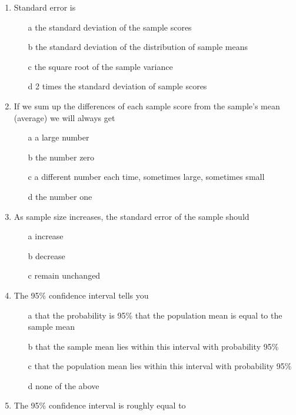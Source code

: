 \documentclass[12pt]{book}
\begin{document}
\begin{enumerate}
\item Standard error is

\begin{enumerate}
\item[a] the standard deviation of the sample scores
\item[b] the standard deviation of the distribution of sample means
\item[c] the square root of the sample variance
\item[d] 2 times the standard deviation of sample scores
\end{enumerate}

\item
If we sum up the differences of each sample score from the sample's mean (average) we will always get

\begin{enumerate}
\item[a] a large number
\item[b] the number zero
\item[c] a different number each time, sometimes large, sometimes small
\item[d] the number one
\end{enumerate}

\item As sample size increases, the standard error of the sample should

\begin{enumerate}
\item[a]
increase
\item[b]
decrease
\item[c]
remain unchanged
\end{enumerate}

\item
The 95\% confidence interval tells you

\begin{enumerate}
\item[a]
that the probability is 95\% that the population mean is equal to the sample mean
\item[b]
that the sample mean lies within this interval with probability 95\%
\item[c]
that the population mean lies within this interval with probability 95\%
\item[d] 
none of the above
\end{enumerate}

\item
The 95\% confidence interval is roughly equal to 


\end{enumerate}
\end{document}
